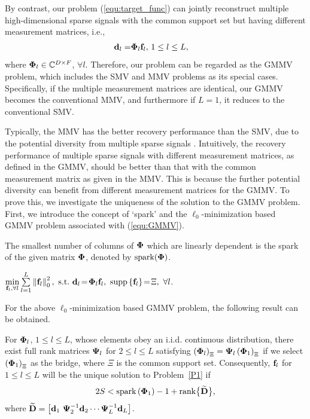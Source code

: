 \documentclass[final]{IEEEtran}
\begin{document}
 By contrast, our problem (\ref{equ:target_func}) can jointly reconstruct multiple
 high-dimensional sparse signals with the common support set but having different measurement
 matrices, i.e.,
\begin{align}\label{equ:GMMV} %
 {\bf{d}}_l =& {\bf{\Phi}}_l{\bf f}_l, \, 1\le l \le L,
\end{align}
 where ${\bf{\Phi}}_l\in \mathbb{C}^{D\times F}$, $\forall l$. Therefore, our problem can
 be regarded as the GMMV problem, which includes the SMV and MMV problems as
 its special cases. Specifically, if the multiple measurement matrices are identical, our GMMV
 becomes the conventional MMV, and furthermore if $L=1$, it reduces to the conventional SMV.

 Typically, the MMV has the better recovery performance than the SMV, due to the potential
 diversity from multiple sparse signals \cite{STR_CS}. Intuitively, the recovery performance
 of multiple sparse signals with different measurement matrices, as defined in the GMMV,
 should be better than that with the common measurement matrix as given in the MMV. This is
 because the further potential diversity can benefit from different measurement matrices for
 the GMMV. To prove this, we investigate the uniqueness of the solution to the GMMV problem.
 First, we introduce the concept of `spark' and the $\ell_{0}$-minimization based GMMV problem
 associated with (\ref{equ:GMMV}).

\begin{definition}\cite{STR_CS} \label{D1}
 The smallest number of columns of $\bf{\Phi}$ which are linearly dependent is the spark of
 the given matrix $\bf{\Phi}$, denoted by ${\rm spark}(\bf{\Phi})$.
\end{definition}

\begin{problem} \label{P1}
 $\min\limits_{{\bf f}_l,\forall l} \sum\limits_{l=1}^L \left\| {\bf f}_l \right\|_0^2 ,
~{\rm{s.t.}}~{\bf d}_l\!=\!{\bf{\Phi}}_l {\bf f}_l,~{\rm{supp}}\left\{ {\bf f}_l\right\}\!=\! \Xi,~\forall l$. %
\end{problem}

 For the above $\ell_{0}$-minimization based GMMV problem, the following result can be obtained.

\begin{theorem}\label{T1}
 For ${\bf{\Phi}}_l$, $1\le l\le L$, whose elements obey an i.i.d. continuous distribution,
 there exist full rank matrices ${\bf{\Psi}}_l$ for $2\le l\le L$ satisfying
 $\left( {\bf{\Phi}}_l \right)_{\Xi}={\bf{\Psi}}_l\left( {\bf{\Phi}}_1 \right)_{\Xi}$
 if we select $\left( {\bf{\Phi}}_1\right)_{\Xi}$ as the bridge, where $\Xi$ is the
 common support set. Consequently, ${\bf f}_l$ for $1\le l\le L$  will be the unique solution
 to Problem~\ref{P1} if
\begin{align}\label{equ:GMMV3} %
 2S <\rm{spark}\left( {\bf{\Phi}}_1 \right) - 1 + \rm{rank}\big\{ \widetilde{\bf D}\big\} ,
\end{align}
 where $\widetilde{\bf D}=\left[ {\bf d}_1 ~ {\bf{\Psi}}_2^{-1} {\bf d}_2 \cdots
 {\bf{\Psi}}_L^{-1} {\bf d}_L\right]$.
\end{theorem}
\end{document}
